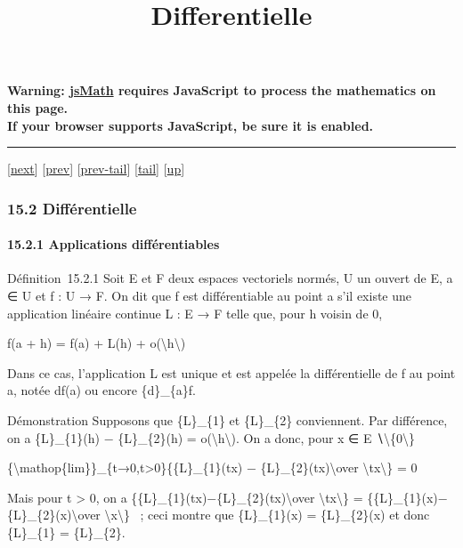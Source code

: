 \documentclass[]{article}
\title{Differentielle}
\author{}
\date{}
\begin{document}
\maketitle

\textbf{Warning: \href{http://www.math.union.edu/locate/jsMath}{jsMath}
requires JavaScript to process the mathematics on this page.\\ If your
browser supports JavaScript, be sure it is enabled.}

\begin{center}\rule{3in}{0.4pt}\end{center}

{[}\href{coursse84.html}{next}{]} {[}\href{coursse82.html}{prev}{]}
{[}\href{coursse82.html\#tailcoursse82.html}{prev-tail}{]}
{[}\hyperref[tailcoursse83.html]{tail}{]}
{[}\href{coursch16.html\#coursse83.html}{up}{]}

\subsubsection{15.2 Différentielle}

\paragraph{15.2.1 Applications différentiables}

Définition~15.2.1 Soit E et F deux espaces vectoriels normés, U un
ouvert de E, a ∈ U et f : U → F. On dit que f est différentiable au
point a s'il existe une application linéaire continue L : E → F telle
que, pour h voisin de 0,

f(a + h) = f(a) + L(h) +
o(\textbackslash{}\textbar{}h\textbackslash{}\textbar{})

Dans ce cas, l'application L est unique et est appelée la différentielle
de f au point a, notée df(a) ou encore \{d\}\_\{a\}f.

Démonstration Supposons que \{L\}\_\{1\} et \{L\}\_\{2\} conviennent.
Par différence, on a \{L\}\_\{1\}(h) − \{L\}\_\{2\}(h) =
o(\textbackslash{}\textbar{}h\textbackslash{}\textbar{}). On a donc,
pour x ∈ E ∖\textbackslash{}\{0\textbackslash{}\}

\{\textbackslash{}mathop\{lim\}\}\_\{t→0,t\textgreater{}0\}\{\{L\}\_\{1\}(tx)
− \{L\}\_\{2\}(tx)\textbackslash{}over
\textbackslash{}\textbar{}tx\textbackslash{}\textbar{}\} = 0

Mais pour t \textgreater{} 0, on a
\{\{L\}\_\{1\}(tx)−\{L\}\_\{2\}(tx)\textbackslash{}over
\textbackslash{}\textbar{}tx\textbackslash{}\textbar{}\} =
\{\{L\}\_\{1\}(x)−\{L\}\_\{2\}(x)\textbackslash{}over
\textbackslash{}\textbar{}x\textbackslash{}\textbar{}\} ~; ceci montre
que \{L\}\_\{1\}(x) = \{L\}\_\{2\}(x) et donc \{L\}\_\{1\} =
\{L\}\_\{2\}.
\end{document}
